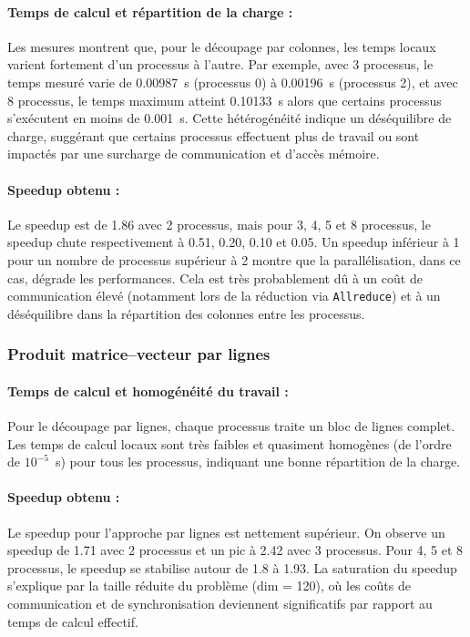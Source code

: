 \documentclass[a4paper,13pt]{book}
\begin{document}
\paragraph{Temps de calcul et répartition de la charge :} 
Les mesures montrent que, pour le découpage par colonnes, les temps locaux varient fortement d'un processus à l'autre. Par exemple, avec 3 processus, le temps mesuré varie de 0.00987~s (processus 0) à 0.00196~s (processus 2), et avec 8 processus, le temps maximum atteint 0.10133~s alors que certains processus s'exécutent en moins de 0.001~s. Cette hétérogénéité indique un déséquilibre de charge, suggérant que certains processus effectuent plus de travail ou sont impactés par une surcharge de communication et d'accès mémoire.

\paragraph{Speedup obtenu :} 
Le speedup est de 1.86 avec 2 processus, mais pour 3, 4, 5 et 8 processus, le speedup chute respectivement à 0.51, 0.20, 0.10 et 0.05. Un speedup inférieur à 1 pour un nombre de processus supérieur à 2 montre que la parallélisation, dans ce cas, dégrade les performances. Cela est très probablement dû à un coût de communication élevé (notamment lors de la réduction via \texttt{Allreduce}) et à un déséquilibre dans la répartition des colonnes entre les processus.

\subsubsection{Produit matrice--vecteur par lignes}

\paragraph{Temps de calcul et homogénéité du travail :} 
Pour le découpage par lignes, chaque processus traite un bloc de lignes complet. Les temps de calcul locaux sont très faibles et quasiment homogènes (de l'ordre de $10^{-5}$~s) pour tous les processus, indiquant une bonne répartition de la charge.

\paragraph{Speedup obtenu :} 
Le speedup pour l'approche par lignes est nettement supérieur. On observe un speedup de 1.71 avec 2 processus et un pic à 2.42 avec 3 processus. Pour 4, 5 et 8 processus, le speedup se stabilise autour de 1.8 à 1.93. La saturation du speedup s'explique par la taille réduite du problème (dim = 120), où les coûts de communication et de synchronisation deviennent significatifs par rapport au temps de calcul effectif.
\end{document}
